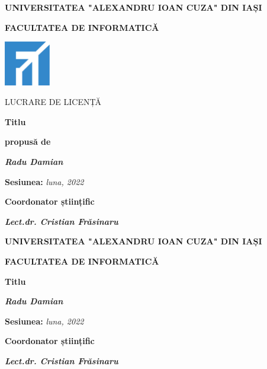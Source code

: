 \documentclass[12pt,a4paper]{report}
\begin{document}
\begin{titlepage}
	\centering
	{\scshape\large \textbf{UNIVERSITATEA "ALEXANDRU IOAN CUZA" DIN IAȘI} \par}
	\vspace{0.5cm}
	{\scshape\Large \textbf{FACULTATEA DE INFORMATICĂ}\par}
	\vspace{2cm}
	\includegraphics[width=0.15\textwidth]{logo-fii}\par\vspace{1cm}
	{\scshape\normalsize LUCRARE DE LICENȚĂ\par}
	\vspace{1cm}
	{\huge\bfseries Titlu\par}
	\vspace{1.5cm}
	{\normalsize \textbf{propusă de}\par}
	\vspace{1cm}
	{\Large\itshape\textbf {Radu Damian}\par}
	\vspace{2cm}
	{\normalsize \textbf{Sesiunea:} \textit{luna, 2022}\par}
	\vspace{1cm}
	{\normalsize \textbf{Coordonator științific}\par}
	\vspace{0.5cm}
	{\Large\itshape\textbf {Lect.dr. Cristian Frăsinaru}\par}
\end{titlepage}

\begin{titlepage}
	\centering
	{\scshape\large \textbf{UNIVERSITATEA "ALEXANDRU IOAN CUZA" DIN IAȘI} \par}
	\vspace{0.5cm}
	{\scshape\Large \textbf{FACULTATEA DE INFORMATICĂ}\par}
	\vspace{5cm}


	{\huge\bfseries Titlu\par}
	\vspace{3cm}
	{\Large\itshape\textbf {Radu Damian}\par}
	\vspace{2cm}
	{\normalsize \textbf{Sesiunea:} \textit{luna, 2022}\par}
	\vspace{4cm}
	{\normalsize \textbf{Coordonator științific}\par}
	\vspace{0.5cm}
	{\Large\itshape\textbf {Lect.dr. Cristian Frăsinaru}\par}
\end{titlepage}
\end{document}
